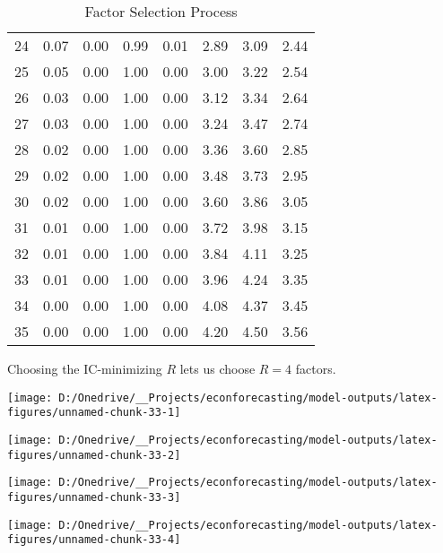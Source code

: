 \documentclass[11pt, letterpaper]{article}\usepackage[]{graphicx}\usepackage[]{color}
\begin{document}
\begin{table}[H]
\begin{tabular}{cccccccc}
   24 & 0.07 & 0.00 & 0.99 & 0.01 & 2.89 & 3.09 & 2.44 \\ 
   25 & 0.05 & 0.00 & 1.00 & 0.00 & 3.00 & 3.22 & 2.54 \\ 
   26 & 0.03 & 0.00 & 1.00 & 0.00 & 3.12 & 3.34 & 2.64 \\ 
   27 & 0.03 & 0.00 & 1.00 & 0.00 & 3.24 & 3.47 & 2.74 \\ 
   28 & 0.02 & 0.00 & 1.00 & 0.00 & 3.36 & 3.60 & 2.85 \\ 
   29 & 0.02 & 0.00 & 1.00 & 0.00 & 3.48 & 3.73 & 2.95 \\ 
   30 & 0.02 & 0.00 & 1.00 & 0.00 & 3.60 & 3.86 & 3.05 \\ 
   31 & 0.01 & 0.00 & 1.00 & 0.00 & 3.72 & 3.98 & 3.15 \\ 
   32 & 0.01 & 0.00 & 1.00 & 0.00 & 3.84 & 4.11 & 3.25 \\ 
   33 & 0.01 & 0.00 & 1.00 & 0.00 & 3.96 & 4.24 & 3.35 \\ 
   34 & 0.00 & 0.00 & 1.00 & 0.00 & 4.08 & 4.37 & 3.45 \\ 
   35 & 0.00 & 0.00 & 1.00 & 0.00 & 4.20 & 4.50 & 3.56 \\ 
   \hline
\end{tabular}
\endgroup
\caption{Factor Selection Process} 
\end{table}


Choosing the IC-minimizing $R$ lets us choose $R = 4$ factors.



{\centering \texttt{[image: D:/Onedrive/\_\_Projects/econforecasting/model-outputs/latex-figures/unnamed-chunk-33-1]} 

}




{\centering \texttt{[image: D:/Onedrive/\_\_Projects/econforecasting/model-outputs/latex-figures/unnamed-chunk-33-2]} 

}




{\centering \texttt{[image: D:/Onedrive/\_\_Projects/econforecasting/model-outputs/latex-figures/unnamed-chunk-33-3]} 

}




{\centering \texttt{[image: D:/Onedrive/\_\_Projects/econforecasting/model-outputs/latex-figures/unnamed-chunk-33-4]} 

}
\end{document}
